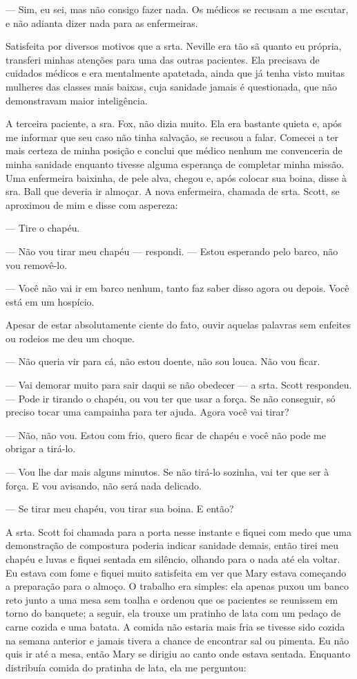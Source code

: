 --- Sim, eu sei, mas não consigo fazer nada. Os médicos se recusam a me
escutar, e não adianta dizer nada para as enfermeiras.

Satisfeita por diversos motivos que a srta. Neville era tão sã quanto eu
própria, transferi minhas atenções para uma das outras pacientes. Ela
precisava de cuidados médicos e era mentalmente apatetada, ainda que já
tenha visto muitas mulheres das classes mais baixas, cuja sanidade
jamais é questionada, que não demonstravam maior inteligência.

A terceira paciente, a sra. Fox, não dizia muito. Ela era bastante
quieta e, após me informar que seu caso não tinha salvação, se recusou a
falar. Comecei a ter mais certeza de minha posição e conclui que médico
nenhum me convenceria de minha sanidade enquanto tivesse alguma
esperança de completar minha missão. Uma enfermeira baixinha, de pele
alva, chegou e, após colocar sua boina, disse à sra. Ball que deveria ir
almoçar. A nova enfermeira, chamada de srta. Scott, se aproximou de mim
e disse com aspereza:

--- Tire o chapéu.

--- Não vou tirar meu chapéu --- respondi. --- Estou esperando pelo
barco, não vou removê-lo.

--- Você não vai ir em barco nenhum, tanto faz saber disso agora ou
depois. Você está em um hospício.

Apesar de estar absolutamente ciente do fato, ouvir aquelas palavras sem
enfeites ou rodeios me deu um choque. 

--- Não queria vir para cá, não
estou doente, não sou louca. Não vou ficar.

--- Vai demorar muito para sair daqui se não obedecer --- a srta. Scott
respondeu. --- Pode ir tirando o chapéu, ou vou ter que usar a força. Se
não conseguir, só preciso tocar uma campainha para ter ajuda. Agora você
vai tirar?

--- Não, não vou. Estou com frio, quero ficar de chapéu e você não pode
me obrigar a tirá-lo.

--- Vou lhe dar mais alguns minutos. Se não tirá-lo sozinha, vai ter que
ser à força. E vou avisando, não será nada delicado.

--- Se tirar meu chapéu, vou tirar sua boina. E então?

A srta. Scott foi chamada para a porta nesse instante e fiquei com medo
que uma demonstração de compostura poderia indicar sanidade demais,
então tirei meu chapéu e luvas e fiquei sentada em silêncio, olhando
para o nada até ela voltar. Eu estava com fome e fiquei muito satisfeita
em ver que Mary estava começando a preparação para o almoço. O trabalho
era simples: ela apenas puxou um banco reto junto a uma mesa sem toalha
e ordenou que os pacientes se reunissem em torno do banquete; a seguir,
ela trouxe um pratinho de lata com um pedaço de carne cozida e uma
batata. A comida não estaria mais fria se tivesse sido cozida na
semana anterior e jamais tivera a chance de encontrar sal ou pimenta. Eu
não quis ir até a mesa, então Mary se dirigiu ao canto onde estava
sentada. Enquanto distribuía comida do pratinha de lata, ela me
perguntou:

